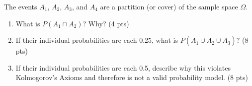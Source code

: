 
\item The events $A_1$, $A_2$, $A_3$, and $A_4$ are a partition (or cover) of the sample space $\Omega$.

\begin{enumerate}

\item What is $P(A_1 \cap A_2)$? Why? (4 pts)

\vfill

\item If their individual probabilities are each 0.25, what is $P(\overline{A_1 \cup A_2 \cup A_3})$? (8 pts)

\vfill \vfill

\item If their individual probabilities are each 0.5, describe why this violates Kolmogorov's Axioms and therefore is not a valid probability model. (8 pts)

\vfill \vfill



\end{enumerate}
